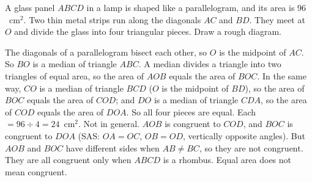 \ques A glass panel $ABCD$ in a lamp is shaped like a parallelogram, and its area is $96$~cm$^2$. Two thin metal strips run along the diagonals $AC$ and $BD$. They meet at $O$ and divide the glass into four triangular pieces. Draw a rough diagram.\par
{}
\begin{answerblock}
 The diagonals of a parallelogram bisect each other, so $O$ is the midpoint of $AC$.\nl
So $BO$ is a median of triangle $ABC$. A median divides a triangle into two triangles of equal area, so the area of $AOB$ equals the area of $BOC$.
 In the same way, $CO$ is a median of triangle $BCD$ ($O$ is the midpoint of $BD$), so the area of $BOC$ equals the area of $COD$; and $DO$ is a median of triangle $CDA$, so the area of $COD$ equals the area of $DOA$.\nl
So all four pieces are equal. Each $=96\div4=24$~cm$^2$.
 Not in general. $AOB$ is congruent to $COD$, and $BOC$ is congruent to $DOA$ (SAS: $OA=OC$, $OB=OD$, vertically opposite angles).\nl
But $AOB$ and $BOC$ have different sides when $AB\ne BC$, so they are not congruent.\nl
They are all congruent only when $ABCD$ is a rhombus. Equal area does not mean congruent.
\begin{center}
\end{center}
\end{answerblock}

